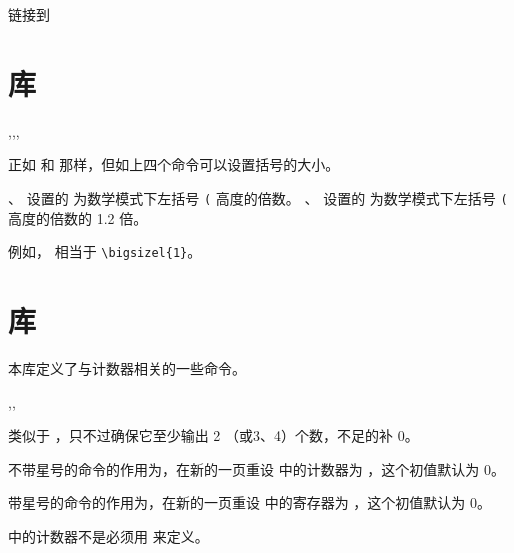 \documentclass[twoside]{book}
\def\xampletext{\par}
\def\xampleprint{\xamplecode \xampleline \xampletext}
\begin{document}
\begin{xample}
\hypersetup{linkcolor=red} 链接到
\stopxamplecode
\label{eg:hyperref-fparbox}
\xampleprint 
\end{xample}

\section{库}

\begin{function}{\delsizel,\delsizer,\bigsizel,\bigsizer}
  \begin{syntax}
    \V\delsizel {} 
    \V\delsizer {} 
  \end{syntax}
正如  和  那样，但如上四个命令可以设置括号的大小。

、 设置的  为数学模式下左括号 \texttt{(} 高度的倍数。
、 设置的  为数学模式下左括号 \texttt{(} 高度的倍数的 1.2 倍。

例如， 相当于 \verb|\bigsizel{1}|。
\end{function}


\section{库}

本库定义了与计数器相关的一些命令。

\begin{function}{\ensuretwodigits,\ensurethreedigits,\ensurefourdigits}
  \begin{syntax}
    \V\ensuretwodigits {}
  \end{syntax}
类似于 ，只不过确保它至少输出 2 （或3、4）个数，不足的补 0。
\end{function}

\begin{function}{\MakePerPage}
  \begin{syntax}
    \V\MakePerPage                 \!
    \V\MakePerPage   {} 
    \V\MakePerPage *               \!
    \V\MakePerPage *  
  \end{syntax}
不带星号的命令的作用为，在新的一页重设  中的计数器为 
，这个初值默认为 0。

带星号的命令的作用为，在新的一页重设  中的寄存器为
，这个初值默认为 0。

 中的计数器不是必须用  来定义。
\end{function}
\end{document}
